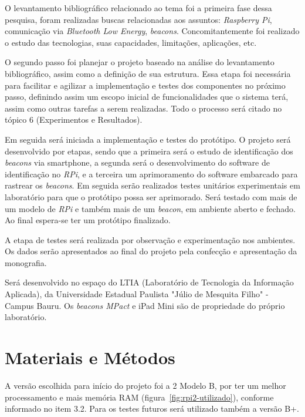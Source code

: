 \documentclass[
		12pt,				%
		openright,			%
		oneside,			%
		a4paper,			%
		chapter=TITLE,		%
		english,			%
		brazil				%
	]{abntex2}
\begin{document}
O levantamento bibliográfico relacionado ao tema foi a primeira fase dessa pesquisa, foram realizadas buscas relacionadas aos assuntos: \textit{Raspberry Pi}, comunicação via \textit{Bluetooth Low Energy}, \textit{beacons}. Concomitantemente foi realizado o estudo das tecnologias, suas capacidades, limitações, aplicações, etc.

O segundo passo foi planejar o projeto baseado na análise do levantamento bibliográfico, assim como a definição de sua estrutura. Essa etapa foi necessária para facilitar e agilizar a implementação e testes dos componentes no próximo passo, definindo assim um escopo inicial de funcionalidades que o sistema terá, assim como outras tarefas a serem realizadas. Todo o processo será citado no tópico 6 (Experimentos e Resultados).

Em seguida será iniciada a implementação e testes do protótipo. O projeto será desenvolvido por etapas, sendo que a primeira será o estudo de identificação dos \textit{beacons} via smartphone, a segunda será o desenvolvimento do software de identificação no \textit{RPi}, e a terceira um aprimoramento do software embarcado para rastrear os \textit{beacons}. Em seguida serão realizados testes unitários experimentais em laboratório para que o protótipo possa ser aprimorado. Será testado com mais de um modelo de \textit{RPi} e também mais de um \textit{beacon}, em ambiente aberto e fechado. Ao final espera-se ter um protótipo finalizado.

A etapa de testes será realizada por observação e experimentação nos ambientes. Os dados serão apresentados ao final do projeto pela confecção e apresentação da monografia.

Será desenvolvido no espaço do LTIA (Laboratório de Tecnologia da Informação Aplicada), da Universidade Estadual Paulista "Júlio de Mesquita Filho" - Campus Bauru. Os \textit{beacons MPact} e iPad Mini são de propriedade do próprio laboratório.



\chapter{Materiais e Métodos}\label{cap:materiais-e-metodos}

A versão escolhida para início do projeto foi a 2 Modelo B, por ter um melhor processamento e mais memória RAM (figura~\ref{fig:rpi2-utilizado}), conforme informado no item 3.2. Para os testes futuros será utilizado também a versão B+.
\end{document}
